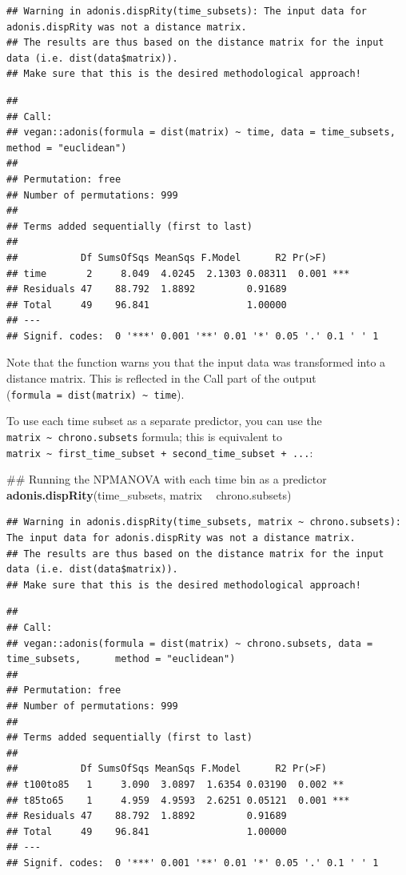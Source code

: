 \documentclass[]{book}
\newenvironment{Shaded}{\begin{snugshade}}{\end{snugshade}}
\newcommand{\KeywordTok}[1]{\textcolor[rgb]{0.13,0.29,0.53}{\textbf{#1}}}
\newcommand{\StringTok}[1]{\textcolor[rgb]{0.31,0.60,0.02}{#1}}
\newcommand{\OperatorTok}[1]{\textcolor[rgb]{0.81,0.36,0.00}{\textbf{#1}}}
\newcommand{\NormalTok}[1]{#1}
\theoremstyle{definition}
\theoremstyle{definition}
\theoremstyle{definition}
\theoremstyle{remark}
\begin{document}
\begin{verbatim}
## Warning in adonis.dispRity(time_subsets): The input data for adonis.dispRity was not a distance matrix.
## The results are thus based on the distance matrix for the input data (i.e. dist(data$matrix)).
## Make sure that this is the desired methodological approach!
\end{verbatim}

\begin{verbatim}
## 
## Call:
## vegan::adonis(formula = dist(matrix) ~ time, data = time_subsets,      method = "euclidean") 
## 
## Permutation: free
## Number of permutations: 999
## 
## Terms added sequentially (first to last)
## 
##           Df SumsOfSqs MeanSqs F.Model      R2 Pr(>F)    
## time       2     8.049  4.0245  2.1303 0.08311  0.001 ***
## Residuals 47    88.792  1.8892         0.91689           
## Total     49    96.841                 1.00000           
## ---
## Signif. codes:  0 '***' 0.001 '**' 0.01 '*' 0.05 '.' 0.1 ' ' 1
\end{verbatim}

Note that the function warns you that the input data was transformed
into a distance matrix. This is reflected in the Call part of the output
(\texttt{formula\ =\ dist(matrix)\ \textasciitilde{}\ time}).

To use each time subset as a separate predictor, you can use the
\texttt{matrix\ \textasciitilde{}\ chrono.subsets} formula; this is
equivalent to
\texttt{matrix\ \textasciitilde{}\ first\_time\_subset\ +\ second\_time\_subset\ +\ ...}:

\begin{Shaded}
\begin{Highlighting}[]
\NormalTok{## Running the NPMANOVA with each time bin as a predictor}
\KeywordTok{adonis.dispRity}\NormalTok{(time_subsets, matrix }\OperatorTok{~}\StringTok{ }\NormalTok{chrono.subsets)}
\end{Highlighting}
\end{Shaded}

\begin{verbatim}
## Warning in adonis.dispRity(time_subsets, matrix ~ chrono.subsets): The input data for adonis.dispRity was not a distance matrix.
## The results are thus based on the distance matrix for the input data (i.e. dist(data$matrix)).
## Make sure that this is the desired methodological approach!
\end{verbatim}

\begin{verbatim}
## 
## Call:
## vegan::adonis(formula = dist(matrix) ~ chrono.subsets, data = time_subsets,      method = "euclidean") 
## 
## Permutation: free
## Number of permutations: 999
## 
## Terms added sequentially (first to last)
## 
##           Df SumsOfSqs MeanSqs F.Model      R2 Pr(>F)    
## t100to85   1     3.090  3.0897  1.6354 0.03190  0.002 ** 
## t85to65    1     4.959  4.9593  2.6251 0.05121  0.001 ***
## Residuals 47    88.792  1.8892         0.91689           
## Total     49    96.841                 1.00000           
## ---
## Signif. codes:  0 '***' 0.001 '**' 0.01 '*' 0.05 '.' 0.1 ' ' 1
\end{verbatim}
\end{document}
